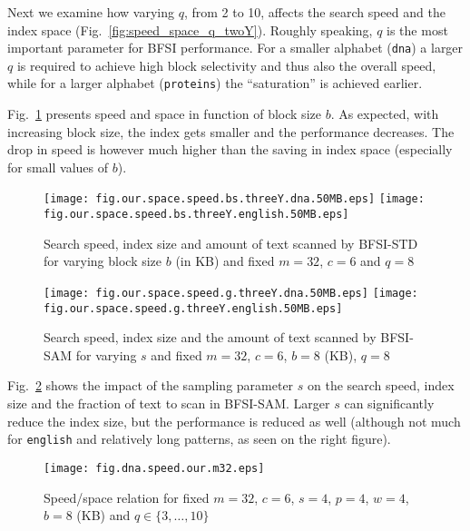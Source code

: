 \documentclass{llncs}
\begin{document}
Next we examine how varying $q$, from 2 to 10, affects 
the search speed and the index space (Fig.~\ref{fig:speed_space_q_twoY}).
Roughly speaking, $q$ is the most important parameter for BFSI performance.
For a smaller alphabet (\texttt{dna}) a larger $q$ is required to achieve 
high block selectivity and thus also the overall speed, while for a larger alphabet (\texttt{proteins})
the ``saturation'' is achieved earlier.



Fig.~\ref{fig:speed_space_bs_threeY} presents speed and space in function of block size $b$.
As expected, with increasing block size, the index gets smaller and the performance decreases. 
The drop in speed is however much higher than the saving in index space 
(especially for small values of $b$). 



\begin{figure}[pt]
\centerline{
\texttt{[image: fig.our.space.speed.bs.threeY.dna.50MB.eps]}
\texttt{[image: fig.our.space.speed.bs.threeY.english.50MB.eps]}
}
\caption[Results]
{Search speed, index size and amount of text scanned by BFSI-STD for varying block size $b$ (in KB) and fixed $m=32$, $c=6$ and $q=8$}
\label{fig:speed_space_bs_threeY}
\end{figure}




\begin{figure}[pt]
\centerline{
\texttt{[image: fig.our.space.speed.g.threeY.dna.50MB.eps]}
\texttt{[image: fig.our.space.speed.g.threeY.english.50MB.eps]}
}
\caption[Results]
{Search speed, index size and the amount of text scanned by BFSI-SAM for varying $s$ and fixed $m=32$, $c=6$, $b=8$ (KB), $q=8$}
\label{fig:speed_space_g_threeY}
\end{figure}








Fig.~\ref{fig:speed_space_g_threeY} shows the impact of the sampling 
parameter $s$ on the search speed, index size and the fraction of text to scan 
in BFSI-SAM.
Larger $s$ can significantly reduce the index size,
but the performance is reduced as well (although not much for \texttt{english} and relatively long patterns, 
as seen on the right figure). 



\begin{figure}[h]
\centerline{
\texttt{[image: fig.dna.speed.our.m32.eps]}
}
\caption[Results]
{Speed/space relation for fixed $m=32$, $c=6$, $s=4$, $p=4$, $w=4$, $b=8$ (KB) and $q \in \{3,\ldots,10\}$}
\label{fig:fig_dna_speed_our_m32_eps}
\end{figure}
\end{document}
